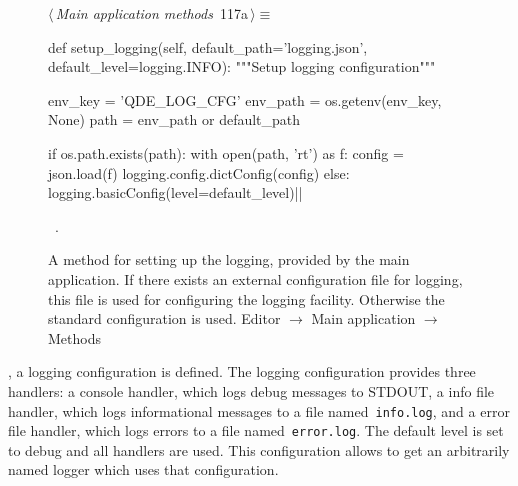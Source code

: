 \documentclass[%
    a4paper,    %
    justified,  %
    nobib,      %
    openany     %
]{tufte-book}
\makeatletter
\renewcommand{\label}[1]{\@tufte@label{##1}}%
\makeatother
\begin{document}
\begin{figure}[!htbp]
\begin{flushleft} \small
\begin{minipage}{\linewidth}\label{scrap54}\raggedright\small
{} $\langle\,${\itshape Main application methods}\nobreak\ {\footnotesize {117a}}$\,\rangle\equiv$
\vspace{-1ex}
\begin{pythoncode}
def setup_logging(self,
                  default_path='logging.json',
                  default_level=logging.INFO):
    """Setup logging configuration"""

    env_key  = 'QDE_LOG_CFG'
    env_path = os.getenv(env_key, None)
    path     = env_path or default_path

    if os.path.exists(path):
        with open(path, 'rt') as f:
            config = json.load(f)
            logging.config.dictConfig(config)
    else:
        logging.basicConfig(level=default_level)|\NWsep|
\end{pythoncode}
\vspace{1.5ex}
\footnotesize
\begin{list}{}{\setlength{\itemsep}{-\parsep}\setlength{\itemindent}{-\leftmargin}}
\item \NWtxtMacroRefIn\ .

\item{}
\end{list}
\end{minipage}\vspace{4ex}
\end{flushleft}
\caption{A method for setting up the logging, provided by the main application.
  If there exists an external configuration file for logging, this file is used
  for configuring the logging facility. Otherwise the standard configuration is
  used.
  \newline{}\newline{}Editor $\rightarrow$ Main application
  $\rightarrow$ Methods}
\end{figure}

, a logging
configuration is defined. The logging configuration provides three handlers: a
console handler, which logs debug messages to STDOUT, a info file handler, which
logs informational messages to a file named~\verb=info.log=, and a error file
handler, which logs errors to a file named~\verb=error.log=. The default level
is set to debug and all handlers are used. This configuration allows to get an
arbitrarily named logger which uses that configuration.
\end{document}
